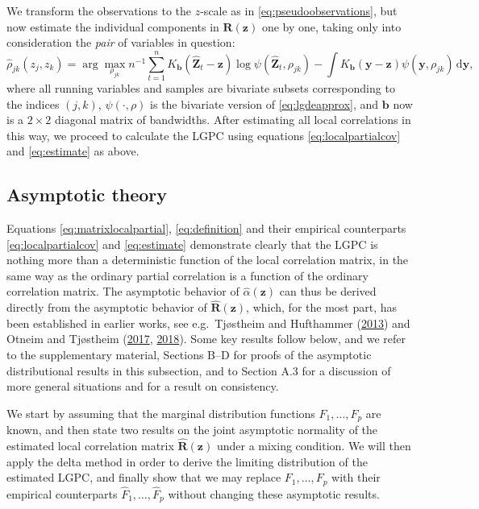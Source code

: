 \documentclass[
  12pt,
  letterpaper]{article}
\newcommand{\z}{\bm{z}}
\newcommand{\hZ}{\widehat{\bm{Z}}}
\newcommand{\y}{\bm{y}}
\newcommand{\R}{\bm{R}}
\newcommand{\hR}{\widehat{\bm{R}}}
\newcommand{\hF}{\widehat{F}}
\newcommand{\hrho}{\widehat{\rho}}
\newcommand{\hh}{\bm{b}}
\newcommand{\halpha}{\widehat{\alpha}}
\theoremstyle{definition}
\theoremstyle{definition}
\theoremstyle{definition}
\theoremstyle{remark}
\begin{document}
We transform the observations to the \(z\)-scale as in \eqref{eq:pseudoobservations}, but now estimate the individual components in \(\R(\z)\) one by one, taking only into consideration the \emph{pair} of variables in question:
\begin{equation}
\hrho_{jk}(z_j, z_k) = \arg\max_{\rho_{jk}} n^{-1} \sum_{t=1}^nK_{\hh}(\hZ_t - \z)\log\psi(\hZ_t, \rho_{jk}) - \int K_{\hh}(\y - \z)\psi(\y, \rho_{jk})\,\textrm{d}\y, 
\label{eq:locallik2}
\end{equation}
where all running variables and samples are bivariate subsets corresponding to the indices \((j,k)\), \(\psi(\cdot, \rho)\) is the bivariate version of \eqref{eq:lgdeapprox}, and \(\hh\) now is a \(2\times2\) diagonal matrix of bandwidths. After estimating all local correlations in this way, we proceed to calculate the LGPC using equations \eqref{eq:localpartialcov} and \eqref{eq:estimate} as above.

\hypertarget{chap:asymptotic}{%
\subsection{Asymptotic theory}\label{chap:asymptotic}}

Equations \eqref{eq:matrixlocalpartial}, \eqref{eq:definition} and their empirical counterparts \eqref{eq:localpartialcov} and \eqref{eq:estimate} demonstrate clearly that the LGPC is nothing more than a deterministic function of the local correlation matrix, in the same way as the ordinary partial correlation is a function of the ordinary correlation matrix. The asymptotic behavior of \(\halpha(\z)\) can thus be derived directly from the asymptotic behavior of \(\hR(\z)\), which, for the most part, has been established in earlier works, see e.g.~Tjøstheim and Hufthammer (\protect\hyperlink{ref-tjostheim2013local}{2013}) and Otneim and Tjøstheim (\protect\hyperlink{ref-otneim2017locally}{2017}, \protect\hyperlink{ref-otneim2017conditional}{2018}). Some key results follow below, and we refer to the supplementary material, Sections B--D for proofs of the asymptotic distributional results in this subsection, and to Section A.3 for a discussion of more general situations and for a result on consistency.

We start by assuming that the marginal distribution functions \(F_1, \ldots, F_p\) are known, and then state two results on the joint asymptotic normality of the estimated local correlation matrix \(\hR(\z)\) under a mixing condition. We will then apply the delta method in order to derive the limiting distribution of the estimated LGPC, and finally show that we may replace \(F_1,\ldots,F_p\) with their empirical counterparts \(\hF_1,\ldots,\hF_p\) without changing these asymptotic results.
\end{document}
